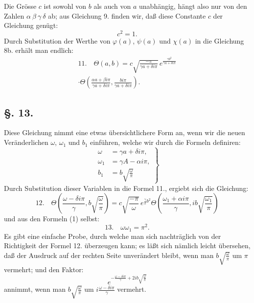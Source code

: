 \documentclass[10pt]{article}
\newcommand{\sourceanchor}[1]{\hypertarget{source-#1}{}}
\begin{document}
Die Grösse \(c\) ist sowohl von \(b\) als auch von \(a\) unabhängig, hängt also nur von den Zahlen \(\alpha\ \beta\ \gamma\ \delta\) ab; aus Gleichung 9. finden wir, daß diese Constante \(c\) der Gleichung genügt:
\begin{equation*}
 c^{2}=1.
\tag{10.}
\end{equation*}
Durch Substitution der Werthe von \(\varphi(a)\), \(\psi(a)\) und \(\chi(a)\) in die Gleichung 8b. erhält man endlich:
\sourceanchor{PA11}
\begin{multline*}
11.\quad\Theta(a,b)=c\sqrt{\frac{-\pi}{\gamma a+\delta i\pi}}\,
 e^{\frac{\gamma b^{2}}{\gamma a+\delta i\pi}}\\
\cdot\Theta\!\left(\frac{\alpha a+\beta i\pi}{\gamma a+\delta i\pi},\frac{bi\pi}{\gamma a+\delta i\pi}\right).
\end{multline*}

\subsection*{\S. 13.}
Diese Gleichung nimmt eine etwas übersichtlichere Form an, wenn wir die neuen Veränderlichen \(\omega\), \(\omega_1\) und \(b_1\) einführen, welche wir durch die Formeln definiren:
\begin{equation*}
\left.
\begin{aligned}
\omega&=\gamma a+\delta i\pi,\\
\omega_1&=\gamma A-\alpha i\pi,\\
b_1&=b\sqrt{\frac{\omega}{\pi}}
\end{aligned}
\right\}
\tag{1}
\end{equation*}
Durch Substitution dieser Variablen in die Formel 11., ergiebt sich die Gleichung:
\begin{equation*}
12.\quad
\Theta\!\left(\frac{\omega-\delta i\pi}{\gamma}, b\sqrt{\frac{\omega}{\pi}}\right)
=c\sqrt{\frac{-\pi}{\omega}}\,e^{\frac{\gamma}{\pi}b^{2}}
\Theta\!\left(\frac{\omega_1+\alpha i\pi}{\gamma}, ib\sqrt{\frac{\omega_1}{\pi}}\right)
\end{equation*}
und aus den Formeln (1) selbst:
\begin{equation*}
13.\quad \omega\omega_1=\pi^{2}.
\end{equation*}
Es gibt eine einfache Probe, durch welche man sich nachträglich von der Richtigkeit der Formel 12. überzeugen kann; es läßt sich nämlich leicht übersehen, daß der Ausdruck auf der rechten Seite unverändert bleibt, wenn man \(b\sqrt{\frac{\omega}{\pi}}\) um \(\pi\) vermehrt; und den Faktor:
\[
e^{-\frac{\omega-\delta i\pi}{\gamma}+2ib\sqrt{\frac{\omega}{\pi}}}
\]
annimmt, wenn man \(b\sqrt{\frac{\omega}{\pi}}\) um \(i\frac{\omega-\delta i\pi}{\gamma}\) vermehrt.
\end{document}

